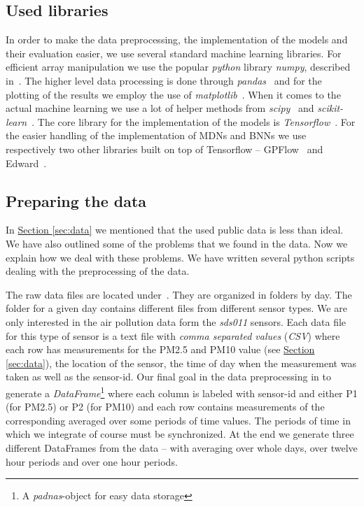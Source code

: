 \documentclass[12pt,a4paper,twoside]{scrartcl}
\numberwithin{equation}{section}
\newcommand{\refsec}[1]{\hyperref[#1]{Section \ref*{#1}}}
\begin{document}
\subsection{Used libraries}\label{sec:libs}
In order to make the data preprocessing, the implementation of the models and their evaluation easier, we use several standard machine learning libraries. For efficient array manipulation we use the popular \emph{python} library \emph{numpy}, described in~\cite{numpy}. The higher level data processing is done through \emph{pandas}~\cite{pandas} and for the plotting of the results we employ the use of \emph{matplotlib}~\cite{matplotlib}. When it comes to the actual machine learning we use a lot of helper methods from \emph{scipy}~\cite{scipy} and \emph{scikit-learn}~\cite{scikit-learn}. The core library for the implementation of the models is \emph{Tensorflow}~\cite{tf}. For the easier handling of the implementation of MDNs and BNNs we use respectively two other libraries built on top of Tensorflow -- GPFlow~\cite{gpflow} and Edward~\cite{edward}. 
\subsection{Preparing the data}\label{sec:prep-data}
In \refsec{sec:data} we mentioned that the used public data is less than ideal. We have also outlined some of the problems that we found in the data. Now we explain how we deal with these problems. We have written several python scripts dealing with the preprocessing of the data. 

The raw data files are located under~\cite{luftdaten}. They are organized in folders by day. The folder for a given day contains different files from different sensor types. We are only interested in the air pollution data form the \emph{sds011} sensors. Each data file for this type of sensor is a text file with \emph{comma separated values} (\emph{CSV}) where each row has measurements for the PM2.5 and PM10 value (see \refsec{sec:data}), the location of the sensor, the time of day when the measurement was taken as well as the sensor-id. Our final goal in the data preprocessing in to generate a \emph{DataFrame}\footnote{A \emph{padnas}-object for easy data storage} where each column is labeled with sensor-id and either P1 (for PM2.5) or P2 (for PM10) and each row contains measurements of the corresponding averaged over some periods of time values. The periods of time in which we integrate of course must be synchronized. At the end we generate three different DataFrames from the data -- with averaging over whole days, over twelve hour periods and over one hour periods.
\end{document}
